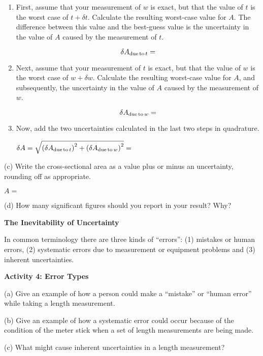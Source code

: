 \begin {enumerate}
\item  First, assume that your measurement of $w$  is exact, but that the value of $t$  is the worst case of $t + \delta t$. Calculate the resulting worst-case value for $A$. The difference between this value and the best-guess value is the uncertainty in the value of $A$ caused by the measurement of $t$. 

\vspace {20mm}
$$
\delta A_{ {\rm due\, to\,} t} =
$$

\item  Next, assume that your measurement of $t$ is exact, but that the value of $w$ is the worst case of $w+ \delta w$. Calculate the resulting worst-case value for $A$, and subsequently, the uncertainty in the value of $A$ caused by the measurement of $w$.

\vspace {20mm}
$$
\delta A_{ {\rm due\, to\,} w}=
$$

\newpage
\item Now, add the two uncertainties calculated in the last two steps in quadrature.

\vspace{4mm}
\hspace {5mm} $\delta A = \sqrt{ \left(\delta A_{{\rm due\, to\,} t}\right)^2 + \left(\delta A_{{\rm due\, to\,} w}\right)^2 } =$

\end {enumerate}



\vspace{15mm}

(c) Write the cross-sectional area as a value plus or minus an uncertainty, rounding off as appropriate.

\vspace{4mm}
\hspace {30mm} $A =$
\vspace{3mm}


(d) How many significant figures should you report in your result? Why?
\vspace{25mm}

\textbf{The Inevitability of Uncertainty} 

In common terminology there are three kinds of ``errors'': (1)
mistakes or human errors, (2) systematic errors due to measurement or equipment
problems and (3) inherent uncertainties.

\textbf{Activity 4: Error Types} 

(a) Give an example of how a person could make a ``mistake''
or ``human error'' while taking a length measurement.
\vspace{15mm}

(b) Give an example of how a systematic error could occur because of the condition
of the meter stick when a set of length measurements are being made.
\vspace{20mm}

(c) What might cause inherent uncertainties in a length measurement?


